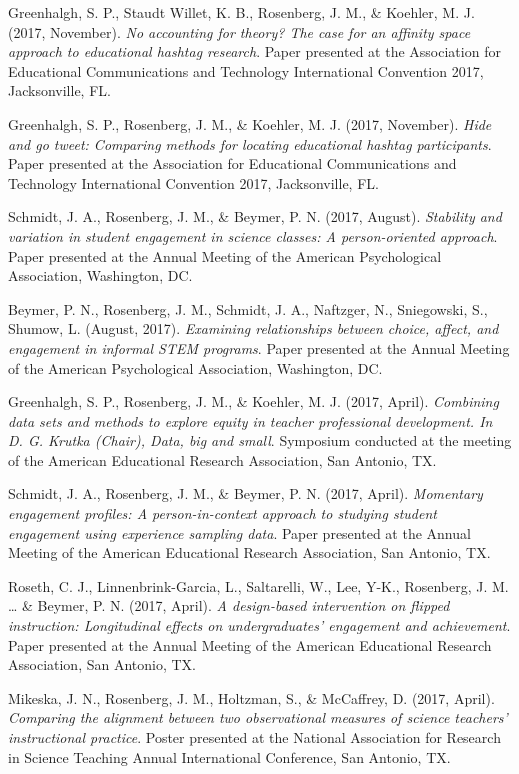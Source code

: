\documentclass[14,]{article}
\begin{document}
Greenhalgh, S. P., Staudt Willet, K. B., Rosenberg, J. M., \& Koehler,
M. J. (2017, November). \emph{No accounting for theory? The case for an
affinity space approach to educational hashtag research}. Paper
presented at the Association for Educational Communications and
Technology International Convention 2017, Jacksonville, FL.

Greenhalgh, S. P., Rosenberg, J. M., \& Koehler, M. J. (2017, November).
\emph{Hide and go tweet: Comparing methods for locating educational
hashtag participants}. Paper presented at the Association for
Educational Communications and Technology International Convention 2017,
Jacksonville, FL.

Schmidt, J. A., Rosenberg, J. M., \& Beymer, P. N. (2017, August).
\emph{Stability and variation in student engagement in science classes:
A person-oriented approach}. Paper presented at the Annual Meeting of
the American Psychological Association, Washington, DC.

Beymer, P. N., Rosenberg, J. M., Schmidt, J. A., Naftzger, N.,
Sniegowski, S., Shumow, L. (August, 2017). \emph{Examining relationships
between choice, affect, and engagement in informal STEM programs}. Paper
presented at the Annual Meeting of the American Psychological
Association, Washington, DC.

Greenhalgh, S. P., Rosenberg, J. M., \& Koehler, M. J. (2017, April).
\emph{Combining data sets and methods to explore equity in teacher
professional development. In D. G. Krutka (Chair), Data, big and small}.
Symposium conducted at the meeting of the American Educational Research
Association, San Antonio, TX.

Schmidt, J. A., Rosenberg, J. M., \& Beymer, P. N. (2017, April).
\emph{Momentary engagement profiles: A person-in-context approach to
studying student engagement using experience sampling data}. Paper
presented at the Annual Meeting of the American Educational Research
Association, San Antonio, TX.

Roseth, C. J., Linnenbrink-Garcia, L., Saltarelli, W., Lee, Y-K.,
Rosenberg, J. M. \ldots{} \& Beymer, P. N. (2017, April). \emph{A
design-based intervention on flipped instruction: Longitudinal effects
on undergraduates' engagement and achievement}. Paper presented at the
Annual Meeting of the American Educational Research Association, San
Antonio, TX.

Mikeska, J. N., Rosenberg, J. M., Holtzman, S., \& McCaffrey, D. (2017,
April). \emph{Comparing the alignment between two observational measures
of science teachers' instructional practice}. Poster presented at the
National Association for Research in Science Teaching Annual
International Conference, San Antonio, TX.
\end{document}
